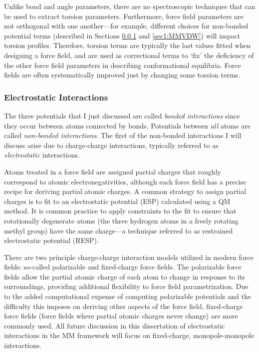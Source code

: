 Unlike bond and angle parameters, there are no spectroscopic techniques that can
be used to extract torsion parameters. Furthermore, force field parameters are
not orthogonal with one another---for example, different choices for non-bonded
potential terms (described in Sections \ref{sec1:MMEEL} and \ref{sec1:MMVDW})
will impact torsion profiles. Therefore, torsion terms are typically the last
values fitted when designing a force field, and are used as correctional terms
to `fix' the deficiency of the other force field parameters in describing
conformational equilibria. Force fields are often systematically improved just
by changing some torsion terms. \cite{Hornak_Proteins_2006_v65_p712,
Perez_BiophysJ_2007_v92_p3817, Lindorff-Larsen_Proteins_2010_v78_p1950}

\subsubsection{Electrostatic Interactions}
\label{sec1:MMEEL}

The three potentials that I just discussed are called \emph{bonded
interactions} since they occur between atoms connected by bonds. Potentials
between \emph{all} atoms are called \emph{non-bonded interactions}. The first of
the non-bonded interactions I will discuss arise due to charge-charge
interactions, typically referred to as \emph{electrostatic} interactions.

Atoms treated in a force field are assigned partial charges that roughly
correspond to atomic electronegativities, although each force field has a
precise recipe for deriving partial atomic charges. A common strategy to assign
partial charges is to fit to an electrostatic potential (ESP) calculated using a
QM method. It is common practice to apply constraints to the fit to ensure that
rotationally degenerate atoms (\eg the three hydrogen atoms in a freely rotating
methyl group) have the same charge---a technique referred to as restrained
electrostatic potential (RESP). \cite{Bayly_JPhysChem_1993_v97_p10269,
Cornell_JAmChemSoc_1993_v115_p9620, Cieplak_JComputChem_1995_v16_p1357}

There are two principle charge-charge interaction models utilized in modern
force fields: so-called polarizable and fixed-charge force fields. The
polarizable force fields allow the partial atomic charge of each atom to change
in response to its surroundings, providing additional flexibility to force field
parametrization. Due to the added computational expense of computing polarizable
potentials and the difficulty this imposes on deriving other aspects of the
force field, fixed-charge force fields (\ie force fields where partial atomic
charges never change) are more commonly used. All future discussion in this
dissertation of electrostatic interactions in the MM framework will focus on
fixed-charge, monopole-monopole interactions.

